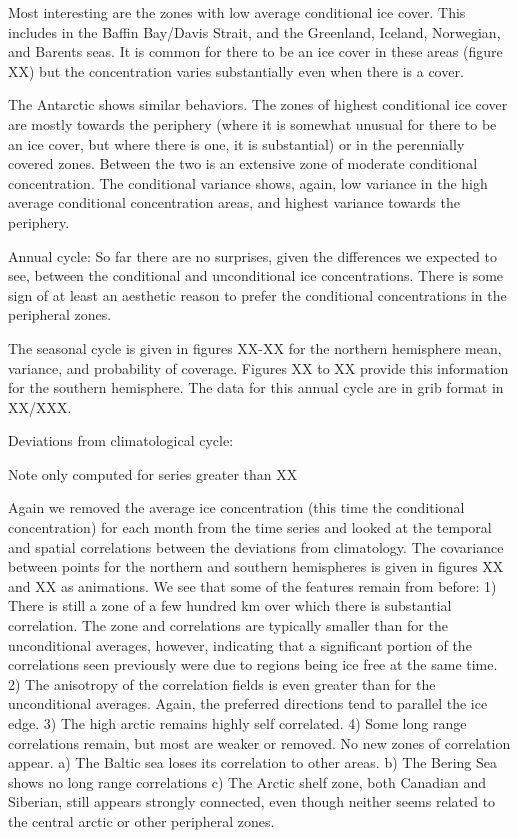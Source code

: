   Most interesting are the zones with low average
conditional ice cover.  This includes in the Baffin Bay/Davis Strait, and 
the Greenland, Iceland, Norwegian, and Barents seas.  It is common for
there to be an ice cover in these areas (figure XX) but the concentration
varies substantially even when there is a cover.   

  The Antarctic shows similar behaviors.  The zones of highest conditional
ice cover are mostly towards the periphery (where it is somewhat unusual 
for there to be an ice cover, but where there is one, it is substantial) or
in the perennially covered zones.  Between the two is an extensive zone 
of moderate conditional concentration.  The conditional variance shows,
again, low variance in the high average conditional concentration areas,
and highest variance towards the periphery.  

Annual cycle:
  So far there are no surprises, given the differences we expected to see,
between the conditional and unconditional ice concentrations.  There
is some sign of at least an aesthetic reason to prefer the conditional
concentrations in the peripheral zones.

  The seasonal cycle is given in figures XX-XX for the northern hemisphere
mean, variance, and probability of coverage.  Figures XX to XX provide this
information for the southern hemisphere.  The data for this annual cycle 
are in grib format in XX/XXX.

Deviations from climatological cycle:

  Note only computed for series greater than XX%

  Again we removed the average ice concentration (this time the conditional
concentration) for each month from the time series and looked at the 
temporal and spatial correlations between the deviations from climatology.
The covariance between points for the northern and southern hemispheres is
given in figures XX and XX as animations.  We see that some of the features
remain from before:
  1) There is still a zone of a few hundred km over which there is substantial
correlation.  The zone and correlations are typically smaller than for 
the unconditional averages, however, indicating that a significant portion 
of the correlations seen previously were due to regions being ice free 
at the same time.   
  2) The anisotropy of the correlation fields is even greater than for
the unconditional averages.  Again, the preferred directions tend to 
parallel the ice edge. 
  3) The high arctic remains highly self correlated.
  4) Some long range correlations remain, but most are weaker or removed.
No new zones of correlation appear.
    a) The Baltic sea loses its correlation to other areas.
    b) The Bering Sea shows no long range correlations
    c) The Arctic shelf zone, both Canadian and Siberian, still appears
        strongly connected, even though neither seems related to the
        central arctic or other peripheral zones.

